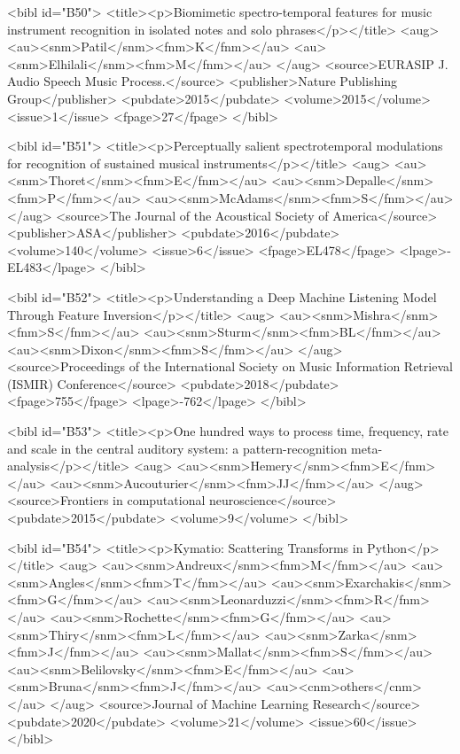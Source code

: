 \documentclass{bmcart}
\begin{document}
\begin{backmatter}
{<bibl id="B50">
  <title><p>Biomimetic spectro-temporal features for music instrument
  recognition in isolated notes and solo phrases</p></title>
  <aug>
    <au><snm>Patil</snm><fnm>K</fnm></au>
    <au><snm>Elhilali</snm><fnm>M</fnm></au>
  </aug>
  <source>EURASIP J. Audio Speech Music Process.</source>
  <publisher>Nature Publishing Group</publisher>
  <pubdate>2015</pubdate>
  <volume>2015</volume>
  <issue>1</issue>
  <fpage>27</fpage>
</bibl>

<bibl id="B51">
  <title><p>Perceptually salient spectrotemporal modulations for recognition of
  sustained musical instruments</p></title>
  <aug>
    <au><snm>Thoret</snm><fnm>E</fnm></au>
    <au><snm>Depalle</snm><fnm>P</fnm></au>
    <au><snm>McAdams</snm><fnm>S</fnm></au>
  </aug>
  <source>The Journal of the Acoustical Society of America</source>
  <publisher>ASA</publisher>
  <pubdate>2016</pubdate>
  <volume>140</volume>
  <issue>6</issue>
  <fpage>EL478</fpage>
  <lpage>-EL483</lpage>
</bibl>

<bibl id="B52">
  <title><p>Understanding a Deep Machine Listening Model Through Feature
  Inversion</p></title>
  <aug>
    <au><snm>Mishra</snm><fnm>S</fnm></au>
    <au><snm>Sturm</snm><fnm>BL</fnm></au>
    <au><snm>Dixon</snm><fnm>S</fnm></au>
  </aug>
  <source>Proceedings of the International Society on Music Information
  Retrieval (ISMIR) Conference</source>
  <pubdate>2018</pubdate>
  <fpage>755</fpage>
  <lpage>-762</lpage>
</bibl>

<bibl id="B53">
  <title><p>One hundred ways to process time, frequency, rate and scale in the
  central auditory system: a pattern-recognition meta-analysis</p></title>
  <aug>
    <au><snm>Hemery</snm><fnm>E</fnm></au>
    <au><snm>Aucouturier</snm><fnm>JJ</fnm></au>
  </aug>
  <source>Frontiers in computational neuroscience</source>
  <pubdate>2015</pubdate>
  <volume>9</volume>
</bibl>

<bibl id="B54">
  <title><p>Kymatio: Scattering Transforms in Python</p></title>
  <aug>
    <au><snm>Andreux</snm><fnm>M</fnm></au>
    <au><snm>Angles</snm><fnm>T</fnm></au>
    <au><snm>Exarchakis</snm><fnm>G</fnm></au>
    <au><snm>Leonarduzzi</snm><fnm>R</fnm></au>
    <au><snm>Rochette</snm><fnm>G</fnm></au>
    <au><snm>Thiry</snm><fnm>L</fnm></au>
    <au><snm>Zarka</snm><fnm>J</fnm></au>
    <au><snm>Mallat</snm><fnm>S</fnm></au>
    <au><snm>Belilovsky</snm><fnm>E</fnm></au>
    <au><snm>Bruna</snm><fnm>J</fnm></au>
    <au><cnm>others</cnm></au>
  </aug>
  <source>Journal of Machine Learning Research</source>
  <pubdate>2020</pubdate>
  <volume>21</volume>
  <issue>60</issue>
</bibl>

}
\end{backmatter}
\end{document}
